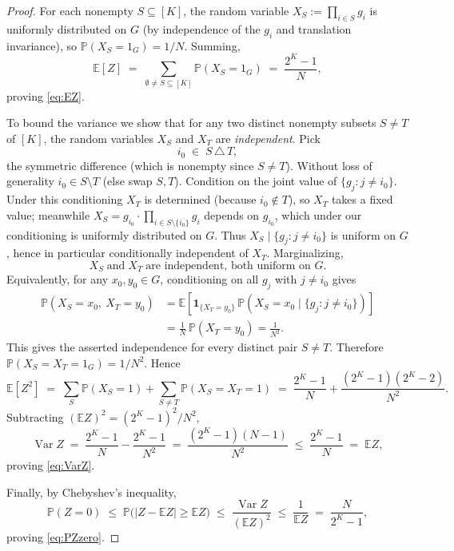 \documentclass[11pt,reqno]{amsart}
\theoremstyle{plain}
\theoremstyle{definition}
\newcommand{\PP}{\mathbb{P}}
\newcommand{\EE}{\mathbb{E}}
\newcommand{\Var}{\operatorname{Var}}
\begin{document}
\begin{proof}
For each nonempty $S\subseteq[K]$, the random variable $X_S:=\prod_{i\in S}g_i$
is uniformly distributed on $G$ (by independence of the $g_i$ and translation
invariance), so $\PP(X_S=1_G)=1/N$. Summing,
\[
\EE[Z] \;=\; \sum_{\emptyset\ne S\subseteq[K]}\PP(X_S=1_G)
\;=\;\frac{2^K-1}{N},
\]
proving \eqref{eq:EZ}.

To bound the variance we show that for any two distinct nonempty subsets $S\ne T$
of $[K]$, the random variables $X_S$ and $X_T$ are \emph{independent}. Pick
\begin{equation}\label{eq:i0-def}
i_0\;\in\;S\,\triangle\,T,
\end{equation}
the symmetric difference (which is nonempty since $S\ne T$). Without loss of
generality $i_0\in S\setminus T$ (else swap $S,T$). Condition on the joint value
of $\{g_j: j\ne i_0\}$. Under this conditioning $X_T$ is determined (because
$i_0\notin T$), so $X_T$ takes a fixed value; meanwhile $X_S=g_{i_0}\cdot\prod_{i\in
S\setminus\{i_0\}}g_i$ depends on $g_{i_0}$, which under our conditioning is
uniformly distributed on $G$. Thus $X_S\mid \{g_j: j\ne i_0\}$ is uniform on $G$,
hence in particular conditionally independent of $X_T$. Marginalizing,
\begin{equation}\label{eq:XSXT-indep}
X_S \;\text{and}\; X_T \;\text{are independent, both uniform on $G$.}
\end{equation}
Equivalently, for any $x_0,y_0\in G$, conditioning on all $g_j$ with
$j\ne i_0$ gives
\[
\begin{aligned}
\PP(X_S=x_0,\ X_T=y_0)
&=
\EE\!\left[
   \mathbf 1_{\{X_T=y_0\}}\,
   \PP(X_S=x_0\mid \{g_j:j\ne i_0\})
 \right]  \\
&=
\frac1N\,\PP(X_T=y_0)
=
\frac1{N^2}.
\end{aligned}
\]
This gives the asserted independence for every distinct pair
$S\ne T$.
Therefore $\PP(X_S=X_T=1_G)=1/N^2$. Hence
\[
\EE[Z^2] \;=\; \sum_{S}\PP(X_S=1)+\sum_{S\ne T}\PP(X_S=X_T=1)
\;=\;\frac{2^K-1}{N}+\frac{(2^K-1)(2^K-2)}{N^2}.
\]
Subtracting $(\EE Z)^2=(2^K-1)^2/N^2$,
\begin{equation}\label{eq:Var-formula}
\Var Z \;=\; \frac{2^K-1}{N}-\frac{2^K-1}{N^2}
\;=\;\frac{(2^K-1)(N-1)}{N^2}
\;\le\; \frac{2^K-1}{N}\;=\;\EE Z,
\end{equation}
proving \eqref{eq:VarZ}.

Finally, by Chebyshev's inequality,
\[
\PP(Z=0) \;\le\; \PP\bigl(|Z-\EE Z|\ge \EE Z\bigr) \;\le\; \frac{\Var Z}{(\EE Z)^2}
\;\le\;\frac{1}{\EE Z} \;=\;\frac{N}{2^K-1},
\]
proving \eqref{eq:PZzero}.
\end{proof}
\end{document}
